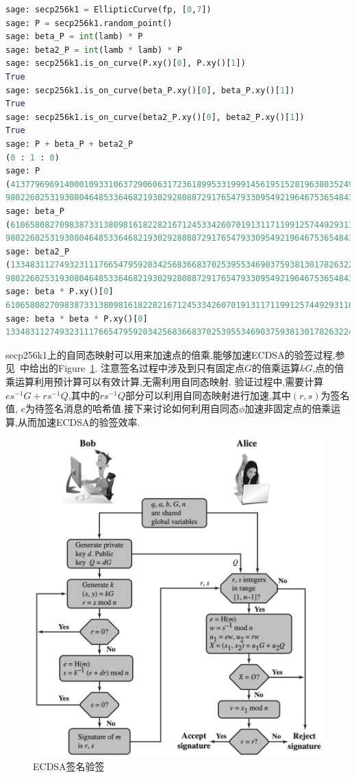 \documentclass{article}
\begin{document}
\begin{lstlisting}[language=python, caption=\texttt{verify endomorphism $\phi$ with $\beta, \lambda$ for secp256k1}, label=lst-verifyphi]
sage: secp256k1 = EllipticCurve(fp, [0,7])
sage: P = secp256k1.random_point()
sage: beta_P = int(lamb) * P
sage: beta2_P = int(lamb * lamb) * P
sage: secp256k1.is_on_curve(P.xy()[0], P.xy()[1])
True
sage: secp256k1.is_on_curve(beta_P.xy()[0], beta_P.xy()[1])
True
sage: secp256k1.is_on_curve(beta2_P.xy()[0], beta2_P.xy()[1])
True
sage: P + beta_P + beta2_P
(0 : 1 : 0)
sage: P
(41377969691400010933106372906063172361899533199914561951528196380352494104025 : 
98022602531930804648533646821930292808872917654793309549219646753654843391634 : 1)
sage: beta_P
(61065808270983873313809816182282167124533426070191311711991257449293116444501 : 
98022602531930804648533646821930292808872917654793309549219646753654843391634 : 1)
sage: beta2_P
(13348311274932311176654795920342568366837025395534690375938130178263224123137 : 
98022602531930804648533646821930292808872917654793309549219646753654843391634 : 1)
sage: beta * P.xy()[0]
61065808270983873313809816182282167124533426070191311711991257449293116444501
sage: beta * beta * P.xy()[0]
13348311274932311176654795920342568366837025395534690375938130178263224123137
\end{lstlisting}

secp256k1上的自同态映射可以用来加速点的倍乘,能够加速ECDSA的验签过程,参见~\cite{stallings}中给出的Figure~\ref{fig-ecdsa}.
注意签名过程中涉及到只有固定点$G$的倍乘运算$kG$,点的倍乘运算利用预计算可以有效计算,无需利用自同态映射.
验证过程中,需要计算$es^{-1}G+rs^{-1}Q$,其中的$rs^{-1}Q$部分可以利用自同态映射进行加速,其中$(r,s)$为签名值,
$e$为待签名消息的哈希值.接下来讨论如何利用自同态$\phi$加速非固定点的倍乘运算,从而加速ECDSA的验签效率.

\begin{figure}[h]
\centering
\includegraphics[width=.8\textwidth]{ecdsa.png}
\caption{ECDSA签名验签}\label{fig-ecdsa}
\end{figure}
\end{document}
